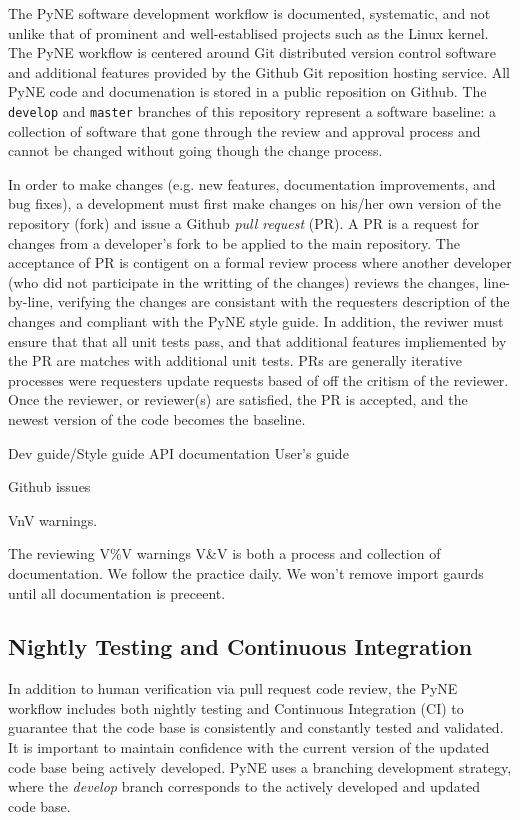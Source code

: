 \documentclass{anstrans}
\begin{document}
The PyNE software development workflow is documented, systematic, and not
unlike that of prominent and well-establised projects such as the Linux kernel.
The PyNE workflow is centered around Git distributed version control software
and additional features provided by the Github Git reposition hosting service.
All PyNE code and documenation is stored in a public reposition on Github. The
\texttt{develop} and \texttt{master} branches of this repository represent a
software baseline: a collection of software that gone through the review and
approval process and cannot be changed without going though the change process.

In order to make changes (e.g. new features, documentation improvements, and
bug fixes), a development must first make changes on his/her own version of the
repository (fork) and issue a Github \emph{pull request} (PR). A PR is a
request for changes from a developer's fork to be applied to the main
repository. The acceptance of PR is contigent on a formal review process where
another developer (who did not participate in the writting of the changes)
reviews the changes, line-by-line, verifying the changes are consistant with
the requesters description of the changes and compliant with the PyNE style
guide. In addition, the reviwer must ensure that that all unit tests pass, and
that additional features impliemented by the PR are matches with additional
unit tests. PRs are generally iterative processes were requesters update
requests based of off the critism of the reviewer. Once the reviewer, or
reviewer(s) are satisfied, the PR is accepted, and the newest version of the
code becomes the baseline.

Dev guide/Style guide
API documentation
User's guide

Github issues

VnV warnings.

The reviewing V\%V warnings 
V\&V is both a process and collection of documentation. We follow the practice daily. We won't remove import gaurds until all documentation is preceent.

\subsection{Nightly Testing and Continuous Integration} 

In addition to human verification via pull request code review, the PyNE
workflow includes both nightly testing and Continuous Integration (CI) to
guarantee that the code base is consistently and constantly tested and
validated. It is important to maintain confidence with the current version of
the updated code base being actively developed. PyNE uses a branching
development strategy, where the \textit{develop} branch corresponds to the
actively developed and updated code base.
\end{document}
